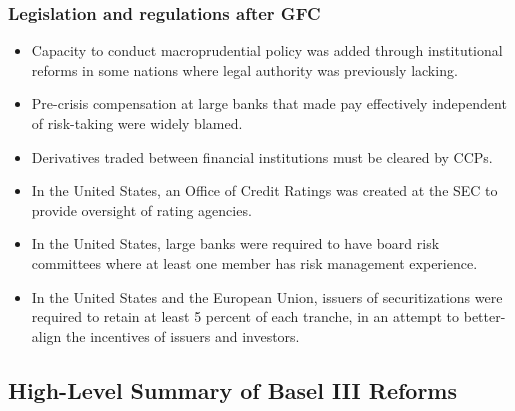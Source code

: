 \subsubsection{Legislation and regulations after GFC}
\begin{itemize}
\item Capacity to conduct macroprudential policy was added through institutional reforms in some nations where legal authority was previously lacking.
\item Pre-crisis compensation at large banks that made pay effectively independent of risk-taking were widely blamed.
\item Derivatives traded between financial institutions must be cleared by CCPs.
\item In the United States, an Office of Credit Ratings was created at the SEC to provide oversight of rating agencies.
\item In the United States, large banks were required to have board risk committees where at least one member has risk management experience.
\item In the United States and the European Union, issuers of securitizations were required to retain at least 5 percent of each tranche, in an attempt to better-align the incentives of issuers and investors.
\end{itemize}



\subsection{High-Level Summary of Basel III Reforms}


